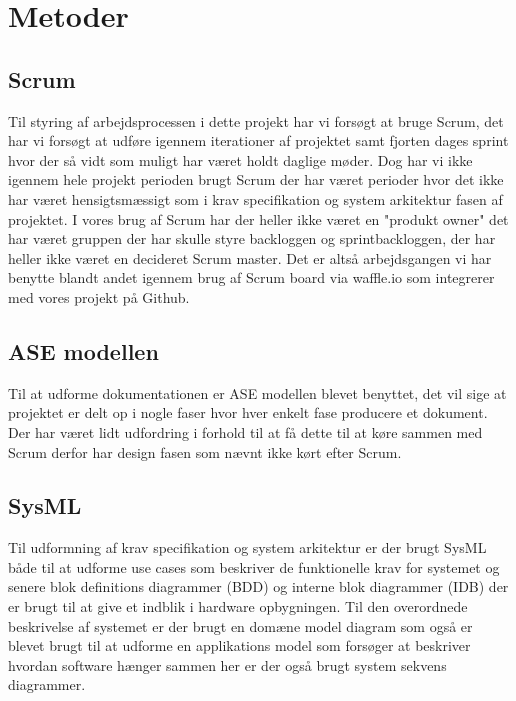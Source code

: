 \section{Metoder}
\subsection{Scrum}
Til styring af arbejdsprocessen i dette projekt har vi forsøgt at bruge Scrum, det har vi forsøgt at udføre igennem iterationer af projektet samt fjorten dages sprint hvor der så vidt som muligt har været holdt daglige møder. Dog har vi ikke igennem hele projekt perioden brugt Scrum der har været perioder hvor det ikke har været hensigtsmæssigt som i krav specifikation og system arkitektur fasen af projektet. I vores brug af Scrum har der heller ikke været en "produkt owner" det har været gruppen der har skulle styre backloggen og sprintbackloggen, der har heller ikke været en decideret Scrum master. Det er altså arbejdsgangen vi har benytte blandt andet igennem brug af Scrum board via waffle.io som integrerer med vores projekt på Github. 

\subsection{ASE modellen}
Til at udforme dokumentationen er ASE modellen blevet benyttet, det vil sige at projektet er delt op i nogle faser hvor hver enkelt fase producere et dokument. Der har været lidt udfordring i forhold til at få dette til at køre sammen med Scrum derfor har design fasen som nævnt ikke kørt efter Scrum.

\subsection{SysML}
Til udformning af krav specifikation og system arkitektur er der brugt SysML både til at udforme use cases som beskriver de funktionelle krav for systemet og senere blok definitions diagrammer (BDD) og interne blok diagrammer (IDB) der er brugt til at give et indblik i hardware opbygningen. Til den overordnede beskrivelse af systemet er der brugt en domæne model diagram som også er blevet brugt til at udforme en applikations model som forsøger at beskriver hvordan software hænger sammen her er der også brugt system sekvens diagrammer.

